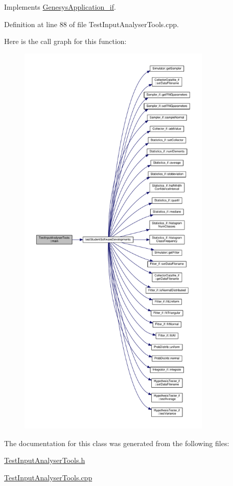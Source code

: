 Implements \hyperlink{class_genesys_application__if_a2b07e7803b410a4a8d0f87422dabb004}{Genesys\-Application\-\_\-if}.



Definition at line 88 of file Test\-Input\-Analyser\-Tools.\-cpp.



Here is the call graph for this function\-:\nopagebreak
\begin{figure}[H]
\begin{center}
\leavevmode
\includegraphics[height=550pt]{class_test_input_analyser_tools_a8015a3024f29bddc865cb0b419214cd7_cgraph}
\end{center}
\end{figure}




The documentation for this class was generated from the following files\-:\begin{DoxyCompactItemize}
\item 
\hyperlink{_test_input_analyser_tools_8h}{Test\-Input\-Analyser\-Tools.\-h}\item 
\hyperlink{_test_input_analyser_tools_8cpp}{Test\-Input\-Analyser\-Tools.\-cpp}\end{DoxyCompactItemize}
